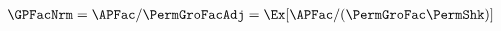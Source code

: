   \begin{align}
    \GPFacNrm  & = \APFac/\PermGroFacAdj = \Ex[\APFac/(\PermGroFac\PermShk)]  \label{eq:GPFacModDefn}
  \end{align}
